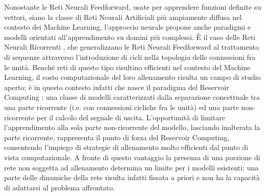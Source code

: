 Nonostante le Reti Neurali Feedforward, usate per apprendere funzioni definite su vettori, siano la classe di Reti Neurali Artificiali più ampiamente diffusa nel contesto dei Machine Learning, l'approccio neurale propone anche paradigmi e modelli orientati all'apprendimento su domini più complessi.
\`E il caso delle Reti Neurali Ricorrenti \cite{Tsoi:DiscreteTimeRNN, Elman:FindingStructure}, che generalizzano le Reti Neurali Feedforward al trattamento di sequenze attraverso l'introduzione di cicli nella topologia delle connessioni fra le unità.
Benché reti di questo tipo risultino efficienti nel contesto del Machine Learning, il costo computazionale del loro allenamento risulta un campo di studio aperto; è in questo contesto infatti che nasce il paradigma del Reservoir Computing \cite{Lukosevicius:ESN-Survey,Verstraeten:AnExperimentalUnification,Jaeger:HarnessingNonlinearity}: una classe di modelli caratterizzati dalla separazione concettuale tra una parte ricorrente (i.e. con connessioni cicliche fra le unità) ed una parte non-ricorrente per il calcolo del segnale di uscita. 
L'opportunità di limitare l'apprendimento alla sola parte non-ricorrente del modello, lasciando inalterata la parte ricorrente, rappresenta il punto di forza del Reservoir Computing, consentendo l'impiego di strategie di allenamento molto efficienti dal punto di vista computazionale. A fronte di questo vantaggio la presenza di una porzione di rete non soggetta ad allenamento determina un limite per i modelli esistenti: una parte delle dinamiche della rete risulta infatti fissata a priori e non ha la capacità di adattarsi al problema affrontato.

